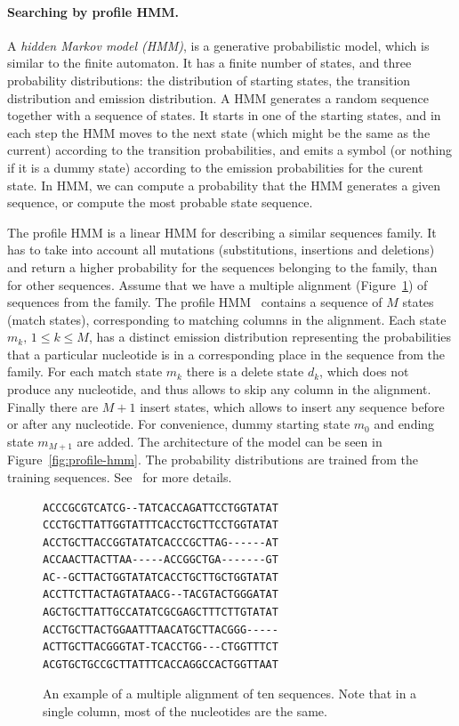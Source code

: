 \paragraph{Searching by profile HMM.}
A \emph{hidden Markov model (HMM)}, is a generative probabilistic model, which is similar to the finite automaton. It has a finite number of states, and three probability distributions: the distribution of starting states, the transition distribution and emission distribution.
A HMM generates a random sequence together with a sequence of states. It starts in one of the starting states, and in each step the HMM moves to the next state (which might be the same as the current) according to the transition probabilities, and emits a symbol (or nothing if it is a dummy state) according to the emission probabilities for the curent state.
In HMM, we can compute a probability that the HMM generates a given sequence, or compute the most probable state sequence.

The profile HMM is a linear HMM for describing a similar sequences family. It has to take into account all mutations (substitutions, insertions and deletions) and return a higher probability for the sequences belonging to the family, than for other sequences.
Assume that we have a multiple alignment (Figure~\ref{fig:multiple-alignment}) of sequences from the family. The profile HMM~\cite{profile-hmm} contains a sequence of $M$ states (match states), corresponding to matching columns in the alignment. Each state $m_k,\, 1 \leq k \leq M$, has a distinct emission distribution representing the probabilities that a particular nucleotide is in a corresponding place in the sequence from the family.
For each match state $m_k$ there is a delete state $d_k$, which does not produce any nucleotide, and thus allows to skip any column in the alignment. Finally there are $M+1$ insert states, which allows to insert any sequence before or after any nucleotide. For convenience, dummy starting state $m_0$ and ending state $m_{M+1}$ are added.
The architecture of the model can be seen in Figure~\ref{fig:profile-hmm}. The probability distributions are trained from the training sequences. See~\cite{profile-hmm} for more details.

\begin{figure}[htp]
\centering
\small
\begin{BVerbatim}
ACCCGCGTCATCG--TATCACCAGATTCCTGGTATAT
CCCTGCTTATTGGTATTTCACCTGCTTCCTGGTATAT
ACCTGCTTACCGGTATATCACCCGCTTAG------AT
ACCAACTTACTTAA-----ACCGGCTGA-------GT
AC--GCTTACTGGTATATCACCTGCTTGCTGGTATAT
ACCTTCTTACTAGTATAACG--TACGTACTGGGATAT
AGCTGCTTATTGCCATATCGCGAGCTTTCTTGTATAT
ACCTGCTTACTGGAATTTAACATGCTTACGGG-----
ACTTGCTTACGGGTAT-TCACCTGG---CTGGTTTCT
ACGTGCTGCCGCTTATTTCACCAGGCCACTGGTTAAT
\end{BVerbatim}
\caption[Multiple alignment]{An example of a multiple alignment of ten sequences. Note that in a single column, most of the nucleotides are the same.}
\label{fig:multiple-alignment}
\end{figure}

